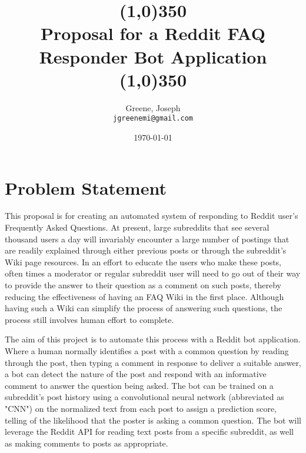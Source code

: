 \documentclass[dvips,11pt]{article}
\begin{document}
\title{\line(1,0){350}\\Proposal for a Reddit FAQ Responder Bot Application\\\line(1,0){350}}

\author{
Greene, Joseph \\
\texttt{jgreenemi@gmail.com}
}
\date{\today}

\maketitle

\section{Problem Statement}

This proposal is for creating an automated system of responding to Reddit user's Frequently Asked Questions. At present, large subreddits that see several thousand users a day will invariably encounter a large number of postings that are readily explained through either previous posts or through the subreddit's Wiki page resources. In an effort to educate the users who make these posts, often times a moderator or regular subreddit user will need to go out of their way to provide the answer to their question as a comment on such posts, thereby reducing the effectiveness of having an FAQ Wiki in the first place. Although having such a Wiki can simplify the process of answering such questions, the process still involves human effort to complete.

The aim of this project is to automate this process with a Reddit bot application. Where a human normally identifies a post with a common question by reading through the post, then typing a comment in response to deliver a suitable answer, a bot can detect the nature of the post and respond with an informative comment to answer the question being asked. The bot can be trained on a subreddit's post history using a convolutional neural network (abbreviated as "CNN") on the normalized text from each post to assign a prediction score, telling of the likelihood that the poster is asking a common question. The bot will leverage the Reddit API for reading text posts from a specific subreddit, as well as making comments to posts as appropriate.

\end{document}
